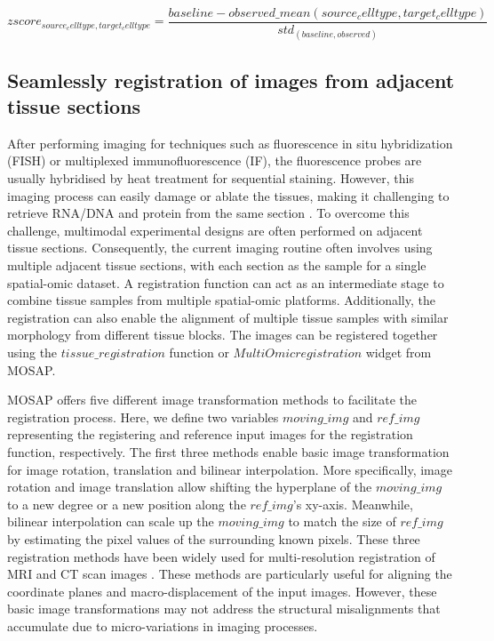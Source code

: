 \begin{equation}
    zscore_{source_celltype, target_celltype} = \frac{baseline - observed\_mean{(source_celltype, target_celltype)}}{std_{(baseline, observed)}}
\label{chap4:eq:03}
\end{equation}
\subsection{Seamlessly registration of images from adjacent tissue sections}
After performing imaging for techniques such as fluorescence in situ hybridization (FISH) or multiplexed immunofluorescence (IF), the fluorescence probes are usually hybridised by heat treatment for sequential staining. However, this imaging process can easily damage or ablate the tissues, making it challenging to retrieve RNA/DNA and protein from the same section \cite{chen2015spatially, wang2012rnascope, hoyt2021multiplex}. To overcome this challenge, multimodal experimental designs are often performed on adjacent tissue sections. Consequently, the current imaging routine often involves using multiple adjacent tissue sections, with each section as the sample for a single spatial-omic dataset. A registration function can act as an intermediate stage to combine tissue samples from multiple spatial-omic platforms. Additionally, the registration can also enable the alignment of multiple tissue samples with similar morphology from different tissue blocks. The images can be registered together using the $tissue\_registration$ function or $MultiOmic registration$ widget from MOSAP. 

MOSAP offers five different image transformation methods to facilitate the registration process. Here, we define two variables $moving\_img$ and $ref\_img$ representing the registering and reference input images for the registration function, respectively. The first three methods enable basic image transformation for image rotation, translation and bilinear interpolation. More specifically, image rotation and image translation allow shifting the hyperplane of the $moving\_img$ to a new degree or a new position along the $ref\_img$'s xy-axis. Meanwhile, bilinear interpolation can scale up the $moving\_img$ to match the size of $ref\_img$ by estimating the pixel values of the surrounding known pixels. These three registration methods have been widely used for multi-resolution registration of MRI and CT scan images \cite{leng2013medical}. These methods are particularly useful for aligning the coordinate planes and macro-displacement of the input images. However, these basic image transformations may not address the structural misalignments that accumulate due to micro-variations in imaging processes.

